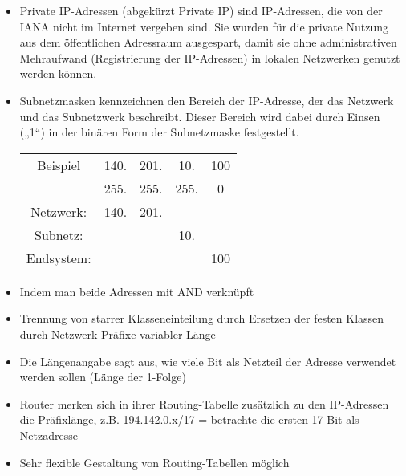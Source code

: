 \begin{itemize}
    \item Private IP-Adressen (abgekürzt Private IP) sind IP-Adressen, die von der IANA nicht im Internet vergeben sind.
    Sie wurden für die private Nutzung aus dem öffentlichen Adressraum ausgespart, damit sie ohne administrativen Mehraufwand (Registrierung der IP-Adressen) in lokalen Netzwerken genutzt werden können.
\end{itemize}

\begin{itemize}
    \item Subnetzmasken kennzeichnen den Bereich der IP-Adresse, der das Netzwerk und das Subnetzwerk beschreibt.
    Dieser Bereich wird dabei durch Einsen („1“) in der binären Form der Subnetzmaske festgestellt.
    \begin{center}
        \begin{tabular}{c|c c c c}
            Beispiel   & 140. & 201. & 10.  & 100 \\
            & 255. & 255. & 255. & 0   \\
            Netzwerk:  & 140. & 201. &      &     \\
            Subnetz:   &      &      & 10.  &     \\
            Endsystem: &      &      &      & 100 \\
        \end{tabular}
    \end{center}
\end{itemize}

\begin{itemize}
    \item Indem man beide Adressen mit AND verknüpft
\end{itemize}

\begin{itemize}
    \item Trennung von starrer Klasseneinteilung durch Ersetzen der festen Klassen durch Netzwerk-Präfixe variabler Länge
    \item Die Längenangabe sagt aus, wie viele Bit als Netzteil der Adresse verwendet werden sollen (Länge der 1-Folge)
    \item Router merken sich in ihrer Routing-Tabelle zusätzlich zu den IP-Adressen die Präfixlänge, z.B. 194.142.0.x/17 = betrachte die ersten 17 Bit als Netzadresse
    \item Sehr flexible Gestaltung von Routing-Tabellen möglich
\end{itemize}


